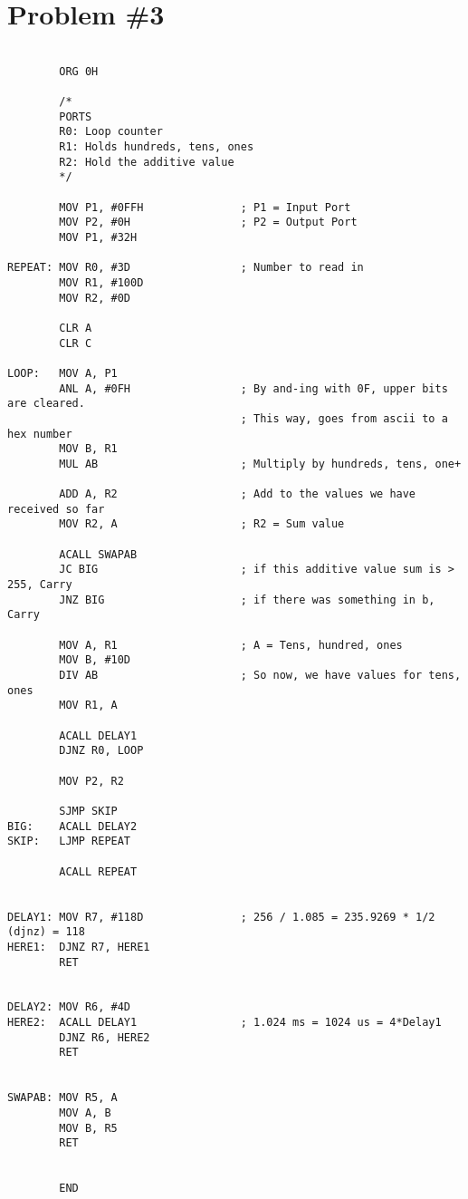 \documentclass[12pt]{article}
\begin{document}
\section{Problem \#3}
\begin{verbatim}

        ORG 0H

        /*
        PORTS
        R0: Loop counter
        R1: Holds hundreds, tens, ones
        R2: Hold the additive value
        */

        MOV P1, #0FFH               ; P1 = Input Port
        MOV P2, #0H                 ; P2 = Output Port
        MOV P1, #32H

REPEAT: MOV R0, #3D                 ; Number to read in
        MOV R1, #100D
        MOV R2, #0D

        CLR A
        CLR C

LOOP:   MOV A, P1
        ANL A, #0FH                 ; By and-ing with 0F, upper bits are cleared.
                                    ; This way, goes from ascii to a hex number
        MOV B, R1
        MUL AB                      ; Multiply by hundreds, tens, one+

        ADD A, R2                   ; Add to the values we have received so far
        MOV R2, A                   ; R2 = Sum value

        ACALL SWAPAB
        JC BIG                      ; if this additive value sum is > 255, Carry
        JNZ BIG                     ; if there was something in b, Carry

        MOV A, R1                   ; A = Tens, hundred, ones
        MOV B, #10D
        DIV AB                      ; So now, we have values for tens, ones
        MOV R1, A

        ACALL DELAY1
        DJNZ R0, LOOP

        MOV P2, R2

        SJMP SKIP
BIG:    ACALL DELAY2
SKIP:   LJMP REPEAT

        ACALL REPEAT


DELAY1: MOV R7, #118D               ; 256 / 1.085 = 235.9269 * 1/2 (djnz) = 118
HERE1:  DJNZ R7, HERE1
        RET


DELAY2: MOV R6, #4D
HERE2:  ACALL DELAY1                ; 1.024 ms = 1024 us = 4*Delay1
        DJNZ R6, HERE2
        RET


SWAPAB: MOV R5, A
        MOV A, B
        MOV B, R5
        RET


        END
\end{verbatim}
\end{document}
